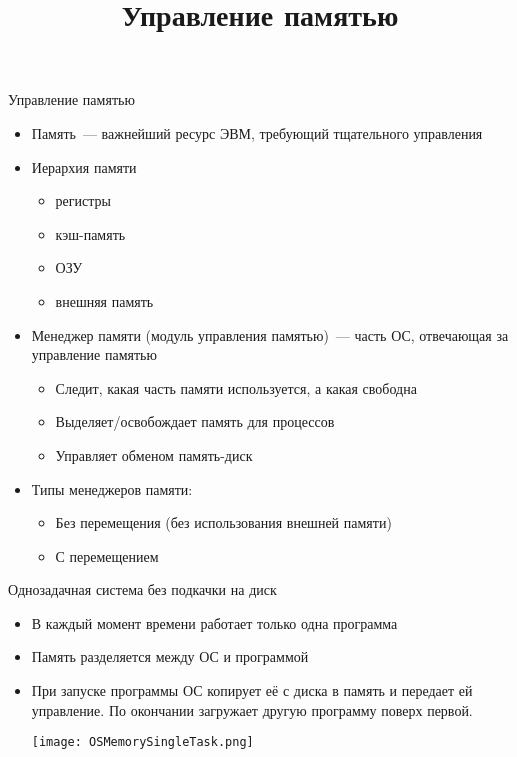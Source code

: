 \documentclass[aspectratio=169,14pt]{beamer}
\title{Управление памятью}
\begin{document}
\begin{frame}{Управление памятью}
    \begin{spacing}{0.9}
    \begin{itemize}
        \item Память~--- важнейший ресурс ЭВМ, требующий тщательного
        управления
        \item Иерархия памяти
        \begin{itemize}
            \item регистры
            \item кэш-память
            \item ОЗУ
            \item внешняя память
        \end{itemize}
        \item Менеджер памяти (модуль управления памятью)~--- часть
        ОС, отвечающая за управление памятью
        \begin{itemize}
            \item Следит, какая часть памяти используется,
            а какая свободна
            \item Выделяет/освобождает память для процессов
            \item Управляет обменом память-диск
        \end{itemize}
        \item Типы менеджеров памяти:
        \begin{itemize}
            \item Без перемещения (без использования внешней памяти)
            \item С перемещением
        \end{itemize}
    \end{itemize}
    \end{spacing}
\end{frame}

\begin{frame}{Однозадачная система без подкачки на диск}
    \begin{itemize}
        \item В каждый момент времени работает только
        одна программа
        \item Память разделяется между ОС и программой
        \item При запуске программы ОС копирует её с диска
        в память и передает ей управление. По окончании загружает
        другую программу поверх первой.

        \texttt{[image: OSMemorySingleTask.png]}
    \end{itemize}
\end{frame}
\end{document}
